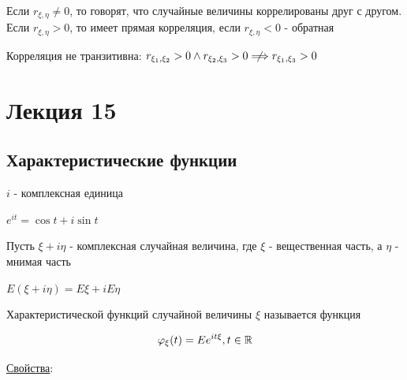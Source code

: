 \documentclass[12pt]{article}
\begin{document}
\Def Если $r_{\xi,\eta} \neq 0$, то говорят, что случайные величины коррелированы друг с другом. Если $r_{\xi,\eta} > 0$, 
то имеет прямая корреляция, если $r_{\xi,\eta} < 0$ - обратная

\Nota Корреляция не транзитивна: $r_{\xi_1,\xi_2} > 0 \land r_{\xi_2,\xi_3} > 0 \centernot\Longrightarrow r_{\xi_1,\xi_3} > 0$






\section{Лекция 15}

\subsection{Характеристические функции}

\Mem $i$ - комплексная единица

\Mems $e^{it} = \cos t + i \sin t$

Пусть $\xi + i\eta$ - комплексная случайная величина, где $\xi$ - вещественная часть, а $\eta$ - мнимая часть

\Def $E(\xi + i\eta) = E\xi + iE\eta$

\hypertarget{characteristicfunction}{}

\Def Характеристической функций случайной величины $\xi$ называется функция 

\[\varphi_\xi(t) = Ee^{it\xi}, t \in \mathbb{R}\]

\underline{Свойства}:
\end{document}
